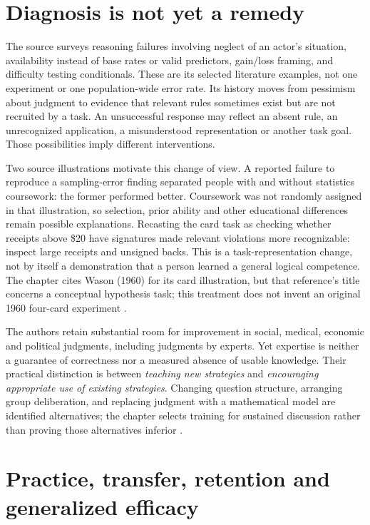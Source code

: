 \section{Diagnosis is not yet a remedy}
\label{sec:p19-r153-diagnosis}

The source surveys reasoning failures involving neglect of an actor's
situation, availability instead of base rates or valid predictors,
gain/loss framing, and difficulty testing conditionals. These are its
selected literature examples, not one experiment or one population-wide
error rate. Its history moves from pessimism about judgment to evidence
that relevant rules sometimes exist but are not recruited by a task.
An unsuccessful response may reflect an absent rule, an unrecognized
application, a misunderstood representation or another task goal.
Those possibilities imply different interventions.

Two source illustrations motivate this change of view. A reported failure
to reproduce a sampling-error finding separated people with and without
statistics coursework: the former performed better. Coursework was not
randomly assigned in that illustration, so selection, prior ability and
other educational differences remain possible explanations. Recasting
the card task as checking whether receipts above \$20 have signatures
made relevant violations more recognizable: inspect large receipts and
unsigned backs. This is a task-representation change, not by itself a
demonstration that a person learned a general logical competence.
The chapter cites Wason (1960) for its card illustration, but that
reference's title concerns a conceptual hypothesis task; this treatment
does not invent an original 1960 four-card experiment
\cite[pp.~802--803, 806]{DeOliveiraNisbett2021Improve}.

The authors retain substantial room for improvement in social, medical,
economic and political judgments, including judgments by experts. Yet
expertise is neither a guarantee of correctness nor a measured absence
of usable knowledge. Their practical distinction is between \emph{teaching
new strategies} and \emph{encouraging appropriate use of existing strategies}.
Changing question structure, arranging group deliberation, and replacing
judgment with a mathematical model are identified alternatives; the
chapter selects training for sustained discussion rather than proving
those alternatives inferior \cite[p.~803]{DeOliveiraNisbett2021Improve}.

\section{Practice, transfer, retention and generalized efficacy}
\label{sec:p19-r153-transfer}

